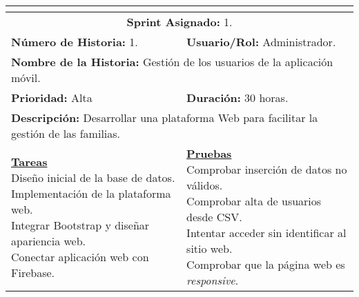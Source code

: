 \resizebox{15cm}{!} {
	\begin{tabular}{|l|l|}
		\hline
		\multicolumn{2}{|c|}{\cellcolor[HTML]{343434}{\color[HTML]{FFFFFF} \textbf{Historia de Usuario}}} \\
		\hline
		\multicolumn{2}{|c|}{\textbf{Sprint Asignado:} 1.} \\
		\hline
		\textbf{Número de Historia:} 1. & \textbf{Usuario/Rol:} Administrador.\\
		\hline
		\multicolumn{2}{|l|}{\textbf{Nombre de la Historia:} Gestión de los usuarios de la aplicación móvil.} \\
		\hline
		\textbf{Prioridad:} Alta & \textbf{Duración:} 30 horas.\\
		\hline
		\multicolumn{2}{|l|}{\textbf{Descripción:} Desarrollar una plataforma Web para facilitar la gestión de las familias.} \\
		\hline
		\specialcell{\underline{\textbf{Tareas}} \\ Diseño inicial de la base de datos. \\ Implementación de la plataforma web. \\ Integrar Bootstrap y diseñar apariencia web. \\ Conectar aplicación web con Firebase.} & \specialcell{\underline{\textbf{Pruebas}} \\ Comprobar inserción de datos no válidos. \\ Comprobar alta de usuarios desde \acs{CSV}. \\ Intentar acceder sin identificar al sitio web. \\ Comprobar que la página web es \textit{responsive}.} \\
		\hline
	\end{tabular}
}